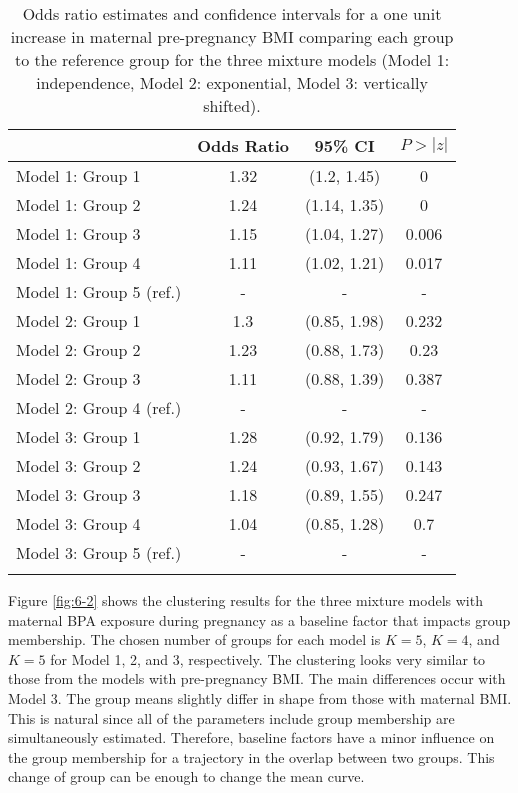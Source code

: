 \begin{table}[ht]
\centering
\begin{tabular}{lccc}
  \thickhline
 & Odds Ratio & 95\% CI& $P>|z|$ \\ 
  \hline
Model 1: Group  1 & 1.32 & (1.2, 1.45) & 0 \\ 
  Model 1: Group  2 & 1.24 & (1.14, 1.35) & 0 \\ 
  Model 1: Group  3 & 1.15 & (1.04, 1.27) & 0.006 \\ 
  Model 1: Group  4 & 1.11 & (1.02, 1.21) & 0.017 \\ 
  Model 1: Group  5  (ref.) & - & - & - \\ 
  Model 2: Group  1 & 1.3 & (0.85, 1.98) & 0.232 \\ 
  Model 2: Group  2 & 1.23 & (0.88, 1.73) & 0.23 \\ 
  Model 2: Group  3 & 1.11 & (0.88, 1.39) & 0.387 \\ 
  Model 2: Group  4  (ref.) & - & - & - \\ 
  Model 3: Group  1 & 1.28 & (0.92, 1.79) & 0.136 \\ 
  Model 3: Group  2 & 1.24 & (0.93, 1.67) & 0.143 \\ 
  Model 3: Group  3 & 1.18 & (0.89, 1.55) & 0.247 \\ 
  Model 3: Group  4 & 1.04 & (0.85, 1.28) & 0.7 \\ 
  Model 3: Group  5  (ref.) & - & - & - \\ 
   \thickhline
\end{tabular}
\caption{Odds ratio estimates and confidence intervals for a one unit increase in maternal pre-pregnancy BMI comparing each group to the reference group for the three mixture models (Model 1: independence, Model 2: exponential, Model 3: vertically shifted). }
\label{tab:6-1}
\end{table}

Figure \ref{fig:6-2} shows the clustering results for the three mixture models with maternal BPA exposure during pregnancy as a baseline factor that impacts group membership. The chosen number of groups for each model is $K = 5$, $K=4$, and $K=5$ for Model 1, 2, and 3, respectively. The clustering looks very similar to those from the models with pre-pregnancy BMI. The main differences occur with Model 3. The group means slightly differ in shape from those with maternal BMI. This is natural since all of the parameters include group membership are simultaneously estimated. Therefore, baseline factors have a minor influence on the group membership for a trajectory in the overlap between two groups. This change of group can be enough to change the mean curve.

